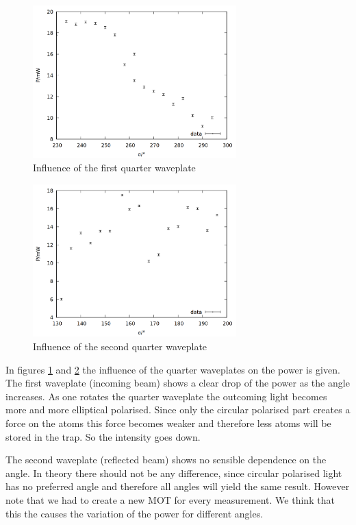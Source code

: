 \begin{figure}
\centering
\includegraphics[width=0.7\textwidth]{data/l42.png}
\caption{Influence of the first quarter waveplate}
\label{fig:l42}
\end{figure}

\begin{figure}
\centering
\includegraphics[width=0.7\textwidth]{data/l41.png}
\caption{Influence of the second quarter waveplate}
\label{fig:l41}
\end{figure}

In figures \ref{fig:l42} and \ref{fig:l41} the influence of the quarter waveplates on the power is given. The first waveplate (incoming beam) shows a clear drop of the power as the angle increases. As one rotates the quarter waveplate the outcoming light becomes more and more elliptical polarised. Since only the circular polarised part creates a force on the atoms this force becomes weaker and therefore less atoms will be stored in the trap. So the intensity goes down.

The second waveplate (reflected beam) shows no sensible dependence on the angle. In theory there should not be any difference, since circular polarised light has no preferred angle and therefore all angles will yield the same result. However note that we had to create a new MOT for every measurement. We think that this the causes the variation of the power for different angles.

